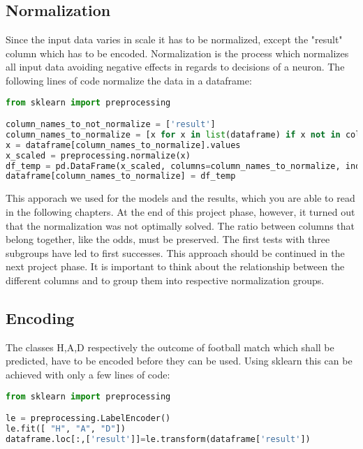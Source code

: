 \subsection {Normalization}
Since the input data varies in scale it has to be normalized, except the "result" column which has to be encoded. Normalization is the process which normalizes all input data avoiding negative effects in regards to decisions of a neuron. 
The following lines of code normalize the data in a dataframe:

\begin{lstlisting}[language=Python, caption=Python code for normalization]
from sklearn import preprocessing

column_names_to_not_normalize = ['result']
column_names_to_normalize = [x for x in list(dataframe) if x not in column_names_to_not_normalize ]
x = dataframe[column_names_to_normalize].values
x_scaled = preprocessing.normalize(x)
df_temp = pd.DataFrame(x_scaled, columns=column_names_to_normalize, index = dataframe.index)
dataframe[column_names_to_normalize] = df_temp
\end{lstlisting}

This apporach we used for the models and the results, which you are able to read in the following chapters. At the end of this project phase, however, it turned out that the normalization was not optimally solved. The ratio between columns that belong together, like the odds, must be preserved. The first tests with three subgroups have led to first successes. This approach should be continued in the next project phase. It is important to think about the relationship between the different columns and to group them into respective normalization groups. 



\subsection {Encoding}

The classes H,A,D respectively the outcome of football match which shall be predicted, have to be encoded before they can be used. Using sklearn this can be achieved with only a few lines of code:

\begin{lstlisting}[language=Python, caption=Python code for encoding classes]
from sklearn import preprocessing

le = preprocessing.LabelEncoder()
le.fit([ "H", "A", "D"])
dataframe.loc[:,['result']]=le.transform(dataframe['result'])
\end{lstlisting}



